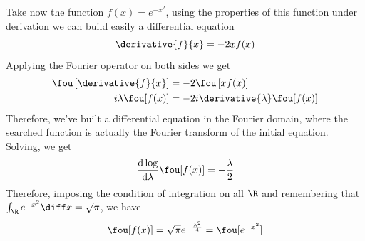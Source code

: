 \documentclass[../mmf.tex]{subfiles}
\begin{document}
\begin{eg}
	Take now the function $f(x)=e^{-x^2}$, using the properties of this function under derivation we can build easily a differential equation
	\begin{equation*}
		\derivative{f}{x}=-2xf(x)
	\end{equation*}
	Applying the Fourier operator on both sides we get
	\begin{equation*}
		\begin{aligned}
			\fou\left[ \derivative{f}{x} \right]&=-2\fou\left[ xf(x) \right]\\
			i\lambda\fou[f(x)]&=-2i\derivative{\lambda}\fou[f(x)]
		\end{aligned}
	\end{equation*}
	Therefore, we've built a differential equation in the Fourier domain, where the searched function is actually the Fourier transform of the initial equation. Solving, we get
	\begin{equation*}
		\frac{\mathrm{d}\log}{\mathrm{d}\lambda}\fou[f(x)]=-\frac{\lambda}{2}
	\end{equation*}
	Therefore, imposing the condition of integration on all $\R$ and remembering that $\int_{\R} e^{-x^2}\diff x=\sqrt{\pi}$, we have
	\begin{equation*}
		\fou[f(x)]=\sqrt{\pi}e^{-\frac{\lambda^2}{4}}=\fou[e^{-x^2}]
	\end{equation*}
\end{eg}
\end{document}
